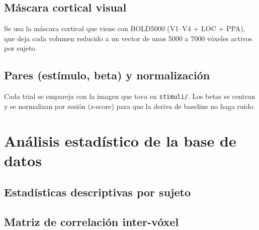 \subsection{Máscara cortical visual}

Se usa la máscara cortical que viene con BOLD5000 (V1–V4 + LOC + PPA),
que deja cada volumen reducido a un vector de unos 5000 a 7000 vóxeles activos
por sujeto.

\subsection{Pares (estímulo, beta) y normalización}

Cada trial se empareja con la imagen que toca en \texttt{stimuli/}. Los betas se centran y 
se normalizan por sesión (z-score) para que la deriva de baseline no haga ruido.

\section{Análisis estadístico de la base de datos}

\subsection{Estadísticas descriptivas por sujeto}

\begin{table}[H]
\centering
{}
\caption[Estadísticas BOLD5000 por sujeto]{Conteo de trials, vóxeles activos en máscara visual, media y desviación de $\beta$, y sesiones por sujeto.}
\label{table:bold5000_stats}
\end{table}

\subsection{Matriz de correlación inter-vóxel}

